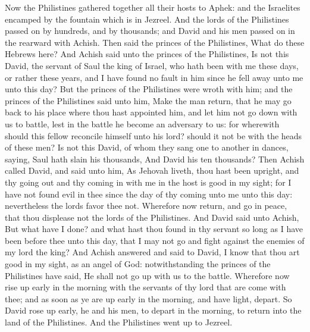 Now the Philistines gathered together all their hosts to Aphek: and the Israelites encamped by the fountain which is in Jezreel. And the lords of the Philistines passed on by hundreds, and by thousands; and David and his men passed on in the rearward with Achish. Then said the princes of the Philistines, What do these Hebrews here? And Achish said unto the princes of the Philistines, Is not this David, the servant of Saul the king of Israel, who hath been with me these days, or rather these years, and I have found no fault in him since he fell away unto me unto this day? But the princes of the Philistines were wroth with him; and the princes of the Philistines said unto him, Make the man return, that he may go back to his place where thou hast appointed him, and let him not go down with us to battle, lest in the battle he become an adversary to us: for wherewith should this fellow reconcile himself unto his lord? should it not be with the heads of these men? Is not this David, of whom they sang one to another in dances, saying, Saul hath slain his thousands, And David his ten thousands?  Then Achish called David, and said unto him, As Jehovah liveth, thou hast been upright, and thy going out and thy coming in with me in the host is good in my sight; for I have not found evil in thee since the day of thy coming unto me unto this day: nevertheless the lords favor thee not. Wherefore now return, and go in peace, that thou displease not the lords of the Philistines. And David said unto Achish, But what have I done? and what hast thou found in thy servant so long as I have been before thee unto this day, that I may not go and fight against the enemies of my lord the king? And Achish answered and said to David, I know that thou art good in my sight, as an angel of God: notwithstanding the princes of the Philistines have said, He shall not go up with us to the battle. Wherefore now rise up early in the morning with the servants of thy lord that are come with thee; and as soon as ye are up early in the morning, and have light, depart. So David rose up early, he and his men, to depart in the morning, to return into the land of the Philistines. And the Philistines went up to Jezreel. 

